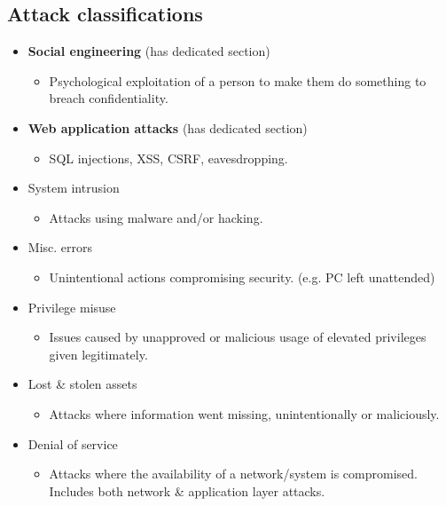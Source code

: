 \documentclass[12pt]{report}
\begin{document}
\subsection{Attack classifications}
\begin{multicols}{1}
\begin{itemize}
	\item \textbf{Social engineering} (has dedicated section) 
		\begin{itemize}
			\item Psychological exploitation of a person to make them do something to breach confidentiality.
		\end{itemize}
	\item \textbf{Web application attacks} (has dedicated section)
		\begin{itemize}
			\item SQL injections, XSS, CSRF, eavesdropping.
		\end{itemize}
	\item System intrusion
		\begin{itemize}
			\item Attacks using malware and/or hacking.
		\end{itemize}
	\item Misc. errors
		\begin{itemize}
			\item Unintentional actions compromising security. (e.g. PC left unattended)
		\end{itemize}
	\item Privilege misuse 
		\begin{itemize}
			\item Issues caused by unapproved or malicious usage of elevated privileges given legitimately.
		\end{itemize}
	\item Lost \& stolen assets
		\begin{itemize}
			\item Attacks where information went missing, unintentionally or maliciously.
		\end{itemize}
	\item Denial of service 
		\begin{itemize}
			\item Attacks where the availability of a network/system is compromised. Includes both network \& application layer attacks.
		\end{itemize}
\end{itemize}
\end{multicols}
\end{document}
